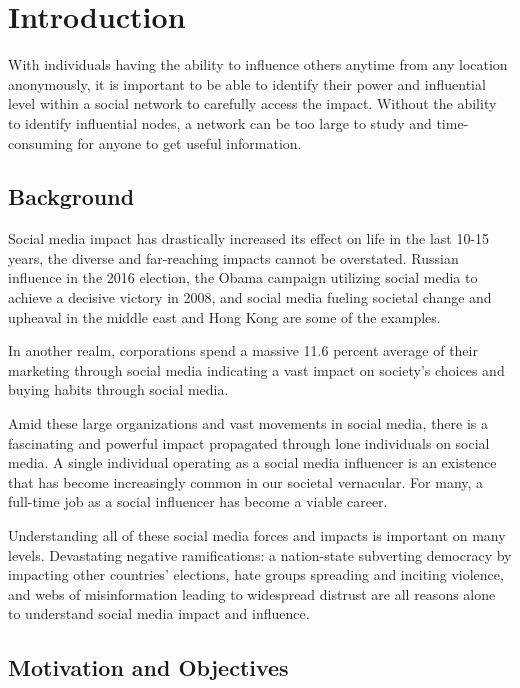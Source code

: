\documentclass[11pt,twocolumn]{article}
\begin{document}
\section{Introduction}

With individuals having the ability to influence others anytime from any location anonymously, it is important to be able to identify their power and influential level within a social network to carefully access the impact. Without the ability to identify influential nodes, a network can be too large to study and time-consuming for anyone to get useful information.    


\subsection{Background}

Social media impact has drastically increased its effect on life in the last 10-15 years, the diverse and far-reaching impacts cannot be overstated. Russian influence in the 2016 election, the Obama campaign utilizing social media to achieve a decisive victory in 2008, and social media fueling societal change and upheaval in the middle east and Hong Kong are some of the examples. 

In another realm, corporations spend a massive 11.6 percent \cite{social-media-pricing} average of their marketing through social media indicating a vast impact on society's choices and buying habits through social media.  

Amid these large organizations and vast movements in social media, there is a fascinating and powerful impact propagated through lone individuals on social media.  A single individual operating as a social media influencer is an existence that has become increasingly common in our societal vernacular. For many, a full-time job as a social influencer has become a viable career. 

Understanding all of these social media forces and impacts is important on many levels. Devastating negative ramifications: a nation-state subverting democracy by impacting other countries’ elections, hate groups spreading and inciting violence, and webs of misinformation leading to widespread distrust are all reasons alone to understand social media impact and influence. 

\subsection{Motivation and Objectives}
\end{document}
